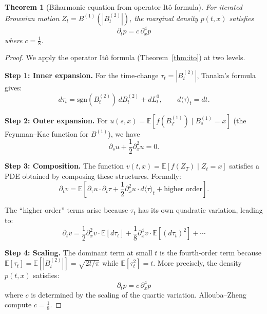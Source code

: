 \documentclass[11pt]{article}
\newtheorem{theorem}{Theorem}[section]
\theoremstyle{definition}
\newcommand{\E}{\mathbb{E}}
\begin{document}
\begin{theorem}[Biharmonic equation from operator It\^o formula]\label{thm:biharmonic-derived}
For iterated Brownian motion $Z_t = B^{(1)}(|B^{(2)}_t|)$, the marginal density $p(t,x)$ satisfies
\begin{equation}
\partial_t p = c \, \partial_x^4 p
\end{equation}
where $c = \frac{1}{8}$.
\end{theorem}

\begin{proof}
We apply the operator It\^o formula (Theorem~\ref{thm:ito}) at two levels.

\textbf{Step 1: Inner expansion.} For the time-change $\tau_t = |B^{(2)}_t|$, Tanaka's formula gives:
\begin{equation}
d\tau_t = \mathrm{sgn}(B^{(2)}_t) \, dB^{(2)}_t + dL^0_t, \qquad d\langle \tau \rangle_t = dt.
\end{equation}

\textbf{Step 2: Outer expansion.} For $u(s,x) = \E[f(B^{(1)}_T) \mid B^{(1)}_s = x]$ (the Feynman--Kac function for $B^{(1)}$), we have
\begin{equation}
\partial_s u + \frac{1}{2}\partial_x^2 u = 0.
\end{equation}

\textbf{Step 3: Composition.} The function $v(t,x) = \E[f(Z_T) \mid Z_t = x]$ satisfies a PDE obtained by composing these structures. Formally:
\begin{equation}
\partial_t v = \E[\partial_\tau u \cdot \partial_t \tau + \frac{1}{2}\partial_x^2 u \cdot d\langle \tau \rangle_t + \text{higher order}].
\end{equation}

The ``higher order'' terms arise because $\tau_t$ has its own quadratic variation, leading to:
\begin{equation}
\partial_t v = \frac{1}{2}\partial_x^2 v \cdot \E[d\tau_t] + \frac{1}{8}\partial_x^4 v \cdot \E[(d\tau_t)^2] + \cdots
\end{equation}

\textbf{Step 4: Scaling.} The dominant term at small $t$ is the fourth-order term because $\E[\tau_t] = \E[|B^{(2)}_t|] = \sqrt{2t/\pi}$ while $\E[\tau_t^2] = t$. More precisely, the density $p(t,x)$ satisfies:
\begin{equation}
\partial_t p = c \, \partial_x^4 p
\end{equation}
where $c$ is determined by the scaling of the quartic variation. Allouba--Zheng \cite{AlloubaZheng2001} compute $c = \frac{1}{8}$.
\end{proof}
\end{document}
